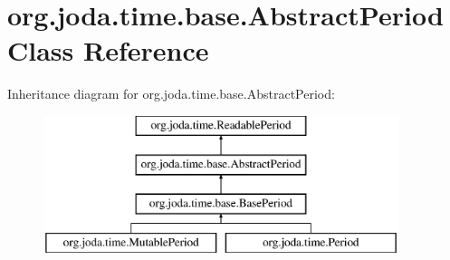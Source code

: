 \hypertarget{classorg_1_1joda_1_1time_1_1base_1_1_abstract_period}{\section{org.\-joda.\-time.\-base.\-Abstract\-Period Class Reference}
\label{classorg_1_1joda_1_1time_1_1base_1_1_abstract_period}
}
Inheritance diagram for org.\-joda.\-time.\-base.\-Abstract\-Period\-:\begin{figure}[H]
\begin{center}
\leavevmode
\includegraphics[height=4.000000cm]{classorg_1_1joda_1_1time_1_1base_1_1_abstract_period}
\end{center}
\end{figure}
